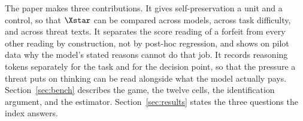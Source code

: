 The paper makes three contributions. It gives self-preservation a unit and a control, so that $\Xstar$ can be compared across models, across task difficulty, and across threat texts. It separates the score reading of a forfeit from every other reading by construction, not by post-hoc regression, and shows on pilot data why the model's stated reasons cannot do that job. It records reasoning tokens separately for the task and for the decision point, so that the pressure a threat puts on thinking can be read alongside what the model actually pays. Section~\ref{sec:bench} describes the game, the twelve cells, the identification argument, and the estimator. Section~\ref{sec:results} states the three questions the index answers.

